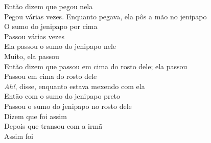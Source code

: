 \bigskip

\begin{linenumbers}\begingroup\raggedright
\noindent Então dizem que pegou nela\\
Pegou várias vezes. Enquanto pegava, ela pôs a mão no jenipapo\\
O sumo do jenipapo por cima\\
Passou várias vezes\\
Ela passou o sumo do jenipapo nele\\
Muito, ela passou\\
Então dizem que passou em cima do rosto dele; ela passou\\
Passou em cima do rosto dele\\
\emph{Ah!}, disse, enquanto estava mexendo com ela\\
Então com o sumo do jenipapo preto\\
Passou o sumo do jenipapo no rosto dele\\
Dizem que foi assim\\
Depois que transou com a irmã\\
Assim foi
\end{linenumbers}\endgroup

\bigskip

